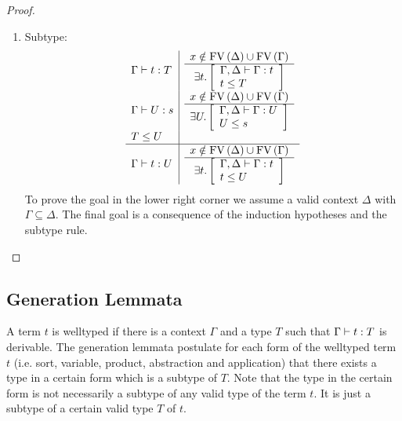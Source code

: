 \begin{lemma}
\begin{proof}
{\begin{enumerate}
\begin{enumerate}
                \item Subtype:
                $$
                \begin{array}{l|l}
                    \Gamma \vdash t: T
                    &
                    \begin{array}{c}  x \notin \text{FV}\, (\Delta) \cup \text{FV}\, (\Gamma)  \\ \hline  \exists t. \left[ \begin{array}{l} \Gamma,\Delta \vdash \Gamma : t \\ t \le T \end{array} \right] \end{array}
                    \\
                    \Gamma \vdash U: s
                    &
                    \begin{array}{c}  x \notin \text{FV}\, (\Delta) \cup \text{FV}\, (\Gamma)  \\ \hline  \exists U. \left[ \begin{array}{l} \Gamma,\Delta \vdash \Gamma : U \\ U \le s \end{array} \right] \end{array}
                    \\
                    T \le U
                    \\
                    \hline
                    \Gamma \vdash t : U
                    &
                    \begin{array}{c}  x \notin \text{FV}\, (\Delta) \cup \text{FV}\, (\Gamma)  \\ \hline  \exists t. \left[ \begin{array}{l} \Gamma,\Delta \vdash \Gamma : t \\ t \le U \end{array} \right] \end{array}
                \end{array}
                $$
                To prove the goal in the lower right corner we assume a valid
                    context $\Delta$ with $\Gamma \subseteq \Delta$. The final
                    goal is a consequence of the induction hypotheses and the
                    subtype rule.
            \end{enumerate}
        \end{enumerate}
        }
    \end{proof}
\end{lemma}






\subsection{Generation Lemmata}

A term $t$ is welltyped if there is a context $\Gamma$ and a type $T$ such that
$\Gamma \vdash t: T$ is derivable. The generation lemmata postulate for each
form of the welltyped term $t$ (i.e. sort, variable, product, abstraction and
application) that there exists a type in a certain form which is a subtype of
$T$. Note that the type in the certain form is not necessarily a subtype of any
valid type of the term $t$. It is just a subtype of a certain valid type $T$ of
$t$.




